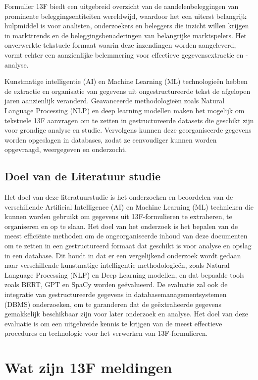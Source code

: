Formulier 13F biedt een uitgebreid overzicht van de aandelenbeleggingen van prominente beleggingsentiteiten wereldwijd, waardoor het een uiterst belangrijk hulpmiddel is voor analisten, onderzoekers en beleggers die inzicht willen krijgen in markttrends en de beleggingsbenaderingen van belangrijke marktspelers. Het onverwerkte tekstuele formaat waarin deze inzendingen worden aangeleverd, vormt echter een aanzienlijke belemmering voor effectieve gegevensextractie en -analyse.

Kunstmatige intelligentie (AI) en Machine Learning (ML) technologieën hebben de extractie en organisatie van gegevens uit ongestructureerde tekst de afgelopen jaren aanzienlijk veranderd. Geavanceerde methodologieën zoals Natural Language Processing (NLP) en deep learning modellen maken het mogelijk om tekstuele 13F aanvragen om te zetten in gestructureerde datasets die geschikt zijn voor grondige analyse en studie. Vervolgens kunnen deze georganiseerde gegevens worden opgeslagen in databases, zodat ze eenvoudiger kunnen worden opgevraagd, weergegeven en onderzocht.
\subsection{Doel van de Literatuur studie}

Het doel van deze literatuurstudie is het onderzoeken en beoordelen van de verschillende Artificial Intelligence (AI) en Machine Learning (ML) technieken die kunnen worden gebruikt om gegevens uit 13F-formulieren te extraheren, te organiseren en op te slaan. Het doel van het onderzoek is het bepalen van de meest efficiënte methoden om de ongeorganiseerde inhoud van deze documenten om te zetten in een gestructureerd formaat dat geschikt is voor analyse en opslag in een database. Dit houdt in dat er een vergelijkend onderzoek wordt gedaan naar verschillende kunstmatige intelligentie methodologieën, zoals Natural Language Processing (NLP) en Deep Learning modellen, en dat bepaalde tools zoals BERT, GPT en SpaCy worden geëvalueerd. De evaluatie zal ook de integratie van gestructureerde gegevens in databasemanagementsystemen (DBMS) onderzoeken, om te garanderen dat de geëxtraheerde gegevens gemakkelijk beschikbaar zijn voor later onderzoek en analyse. Het doel van deze evaluatie is om een uitgebreide kennis te krijgen van de meest effectieve procedures en technologie voor het verwerken van 13F-formulieren. 

\section{Wat zijn 13F meldingen}
